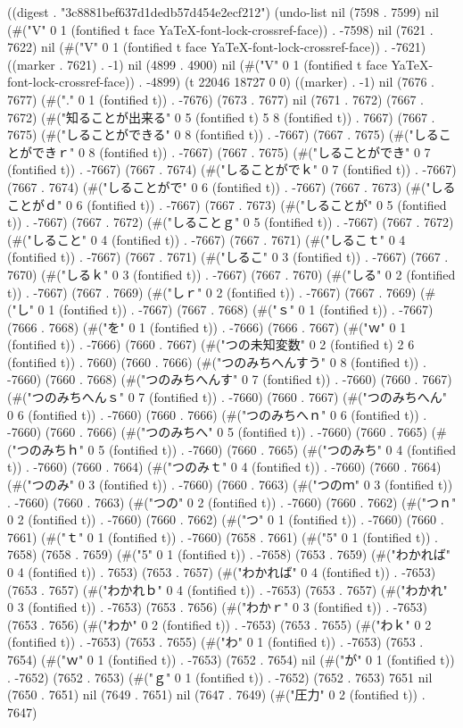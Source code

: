 
((digest . "3c8881bef637d1dedb57d454e2ecf212") (undo-list nil (7598 . 7599) nil (#("V" 0 1 (fontified t face YaTeX-font-lock-crossref-face)) . -7598) nil (7621 . 7622) nil (#("V" 0 1 (fontified t face YaTeX-font-lock-crossref-face)) . -7621) ((marker . 7621) . -1) nil (4899 . 4900) nil (#("V" 0 1 (fontified t face YaTeX-font-lock-crossref-face)) . -4899) (t 22046 18727 0 0) ((marker) . -1) nil (7676 . 7677) (#("." 0 1 (fontified t)) . -7676) (7673 . 7677) nil (7671 . 7672) (7667 . 7672) (#("知ることが出来る" 0 5 (fontified t) 5 8 (fontified t)) . 7667) (7667 . 7675) (#("しることができる" 0 8 (fontified t)) . -7667) (7667 . 7675) (#("しることができｒ" 0 8 (fontified t)) . -7667) (7667 . 7675) (#("しることができ" 0 7 (fontified t)) . -7667) (7667 . 7674) (#("しることがでｋ" 0 7 (fontified t)) . -7667) (7667 . 7674) (#("しることがで" 0 6 (fontified t)) . -7667) (7667 . 7673) (#("しることがｄ" 0 6 (fontified t)) . -7667) (7667 . 7673) (#("しることが" 0 5 (fontified t)) . -7667) (7667 . 7672) (#("しることｇ" 0 5 (fontified t)) . -7667) (7667 . 7672) (#("しること" 0 4 (fontified t)) . -7667) (7667 . 7671) (#("しるこｔ" 0 4 (fontified t)) . -7667) (7667 . 7671) (#("しるこ" 0 3 (fontified t)) . -7667) (7667 . 7670) (#("しるｋ" 0 3 (fontified t)) . -7667) (7667 . 7670) (#("しる" 0 2 (fontified t)) . -7667) (7667 . 7669) (#("しｒ" 0 2 (fontified t)) . -7667) (7667 . 7669) (#("し" 0 1 (fontified t)) . -7667) (7667 . 7668) (#("ｓ" 0 1 (fontified t)) . -7667) (7666 . 7668) (#("を" 0 1 (fontified t)) . -7666) (7666 . 7667) (#("ｗ" 0 1 (fontified t)) . -7666) (7660 . 7667) (#("つの未知変数" 0 2 (fontified t) 2 6 (fontified t)) . 7660) (7660 . 7666) (#("つのみちへんすう" 0 8 (fontified t)) . -7660) (7660 . 7668) (#("つのみちへんす" 0 7 (fontified t)) . -7660) (7660 . 7667) (#("つのみちへんｓ" 0 7 (fontified t)) . -7660) (7660 . 7667) (#("つのみちへん" 0 6 (fontified t)) . -7660) (7660 . 7666) (#("つのみちへｎ" 0 6 (fontified t)) . -7660) (7660 . 7666) (#("つのみちへ" 0 5 (fontified t)) . -7660) (7660 . 7665) (#("つのみちｈ" 0 5 (fontified t)) . -7660) (7660 . 7665) (#("つのみち" 0 4 (fontified t)) . -7660) (7660 . 7664) (#("つのみｔ" 0 4 (fontified t)) . -7660) (7660 . 7664) (#("つのみ" 0 3 (fontified t)) . -7660) (7660 . 7663) (#("つのｍ" 0 3 (fontified t)) . -7660) (7660 . 7663) (#("つの" 0 2 (fontified t)) . -7660) (7660 . 7662) (#("つｎ" 0 2 (fontified t)) . -7660) (7660 . 7662) (#("つ" 0 1 (fontified t)) . -7660) (7660 . 7661) (#("ｔ" 0 1 (fontified t)) . -7660) (7658 . 7661) (#("5" 0 1 (fontified t)) . 7658) (7658 . 7659) (#("5" 0 1 (fontified t)) . -7658) (7653 . 7659) (#("わかれば" 0 4 (fontified t)) . 7653) (7653 . 7657) (#("わかれば" 0 4 (fontified t)) . -7653) (7653 . 7657) (#("わかれｂ" 0 4 (fontified t)) . -7653) (7653 . 7657) (#("わかれ" 0 3 (fontified t)) . -7653) (7653 . 7656) (#("わかｒ" 0 3 (fontified t)) . -7653) (7653 . 7656) (#("わか" 0 2 (fontified t)) . -7653) (7653 . 7655) (#("わｋ" 0 2 (fontified t)) . -7653) (7653 . 7655) (#("わ" 0 1 (fontified t)) . -7653) (7653 . 7654) (#("ｗ" 0 1 (fontified t)) . -7653) (7652 . 7654) nil (#("が" 0 1 (fontified t)) . -7652) (7652 . 7653) (#("ｇ" 0 1 (fontified t)) . -7652) (7652 . 7653) 7651 nil (7650 . 7651) nil (7649 . 7651) nil (7647 . 7649) (#("圧力" 0 2 (fontified t)) . 7647) 